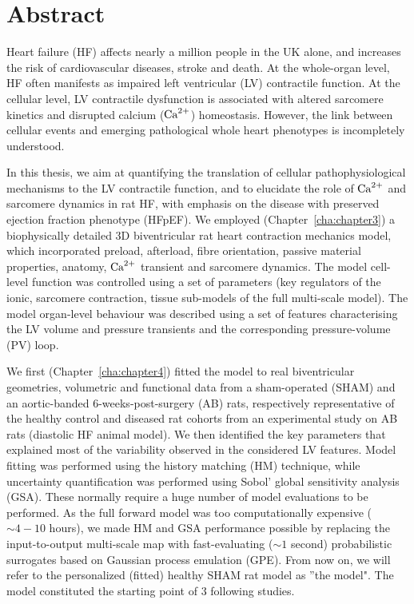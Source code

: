 
\begingroup

\let\clearpage\relax
\let\cleardoublepage\relax
\let\cleardoublepage\relax

\chapter*{Abstract}
Heart failure (HF) affects nearly a million people in the UK alone, and increases the risk
of cardiovascular diseases, stroke and death. At the whole-organ level, HF often manifests as impaired left ventricular (LV) contractile function. At the cellular level, LV contractile dysfunction is associated with altered sarcomere kinetics and disrupted calcium ($\textrm{Ca}^{2+}$) homeostasis. However, the link between cellular events and emerging pathological whole heart phenotypes is incompletely understood.

\vspace{0.2cm}
In this thesis, we aim at quantifying the translation of cellular pathophysiological mechanisms to the LV contractile function, and to elucidate the role of $\textrm{Ca}^{2+}$ and sarcomere dynamics in rat HF, with emphasis on the disease with preserved ejection fraction phenotype (HFpEF). We employed (Chapter~\ref{cha:chapter3}) a biophysically detailed 3D biventricular rat heart contraction mechanics model, which incorporated preload, afterload, fibre orientation, passive material properties, anatomy, $\textrm{Ca}^{2+}$ transient and sarcomere dynamics. The model cell-level function was controlled using a set of parameters (key regulators of the ionic, sarcomere contraction, tissue sub-models of the full multi-scale model). The model organ-level behaviour was described using a set of features characterising the LV volume and pressure transients and the corresponding pressure-volume (PV) loop.

\vspace{0.2cm}
We first (Chapter~\ref{cha:chapter4}) fitted the model to real biventricular geometries, volumetric and functional data from a sham-operated (SHAM) and an aortic-banded 6-weeks-post-surgery (AB) rats, respectively representative of the healthy control and diseased rat cohorts from an experimental study on AB rats (diastolic HF animal model). We then identified the key parameters that explained most of the variability observed in the considered LV features. Model fitting was performed using the history matching (HM) technique, while uncertainty quantification was performed using Sobol' global sensitivity analysis (GSA). These normally require a huge number of model evaluations to be performed. As the full forward model was too computationally expensive ($\sim 4-10$ hours), we made HM and GSA performance possible by replacing the input-to-output multi-scale map with fast-evaluating ($\sim 1$ second) probabilistic surrogates based on Gaussian process emulation (GPE). From now on, we will refer to the personalized (fitted) healthy SHAM rat model as ''the model". The model constituted the starting point of $3$ following studies.

